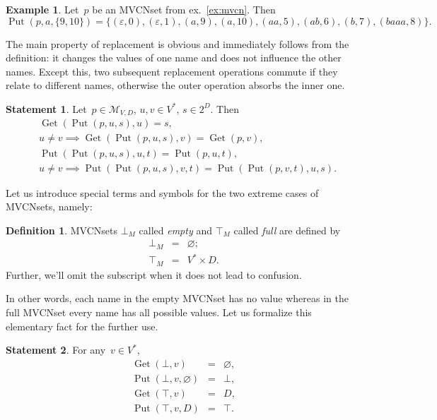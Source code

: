 \documentclass{article}
\theoremstyle{definition}
\newtheorem{Df}{Definition}
\newtheorem{St}{Statement}
\newtheorem{Ex}{Example}
\newcommand{\setcharmvcn}{M}
\newcommand{\setsymbol}[3]{\mathcal{#1}_{#2,#3}}
\newcommand{\setmvcn}[2]{\setsymbol{\setcharmvcn}{#1}{#2}}
\newcommand{\deref}{\operatorname{Get}}
\newcommand{\putval}{\operatorname{Put}}
\begin{document}
\begin{Ex}\label{ex:mvcn-replace}
Let~$p$ be an MVCNset from ex.~\ref{ex:mvcn}. Then
\[
  \putval(p, a, \{ 9, 10 \}) = \{
    (\varepsilon, 0),
    (\varepsilon, 1),
    (a,           9),
    (a,           10),
    (aa,          5),
    (ab,          6),
    (b,           7),
    (baaa,        8)
  \} .
\]
\end{Ex}

The main property of replacement is obvious and immediately follows from the
definition: it changes the values of one name and does not influence the other
names. Except this, two subsequent replacement operations commute if they
relate to different names, otherwise the outer operation absorbs the inner one.
\begin{St}\label{st:mvcn-replace-deref}
Let~$p \in \setmvcn{V}{D}$, $u, v \in V^\ast$, $s \in 2^D$. Then
\begin{eqnarray*}
  & \deref(\putval(p, u, s), u) = s , \\
  & u \neq v \implies \deref(\putval(p, u, s), v) = \deref(p, v) , \\
  & \putval(\putval(p, u, s), u, t) = \putval(p, u, t) , \\
  & u \neq v \implies \putval(\putval(p, u, s), v, t) = \putval(\putval(p, v, t), u, s) .
\end{eqnarray*}
\end{St}

Let us introduce special terms and symbols for the two extreme cases of
MVCNsets, namely:
\begin{Df}\label{df:mvcn-extreme}
MVCNsets $\bot_\setcharmvcn$ called \emph{empty} and $\top_\setcharmvcn$ called
\emph{full} are defined by
\begin{eqnarray*}
  \bot_\setcharmvcn &  = &  \varnothing ; \\
  \top_\setcharmvcn &  = &  V^\ast \times D .
\end{eqnarray*}
Further, we'll omit the subscript when it does not lead to confusion.
\end{Df}

In other words, each name in the empty MVCNset has no value whereas in the
full MVCNset every name has all possible values. Let us formalize this
elementary fact for the further use.
\begin{St}\label{st:mvcn-extreme-deref}
For any~$v\in V^\ast$,
\begin{eqnarray*}
  \deref(\bot, v) & = & \varnothing, \\
  \putval(\bot, v, \varnothing) & = & \bot , \\
  \deref(\top, v) & = & D , \\
  \putval(\top, v, D) & = & \top .
\end{eqnarray*}
\end{St}
\end{document}
